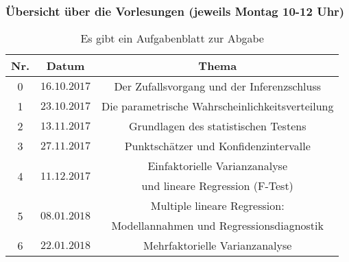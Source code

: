 \documentclass[usenames,dvipsnames,handout]{beamer}
\begin{document}
 \begin{frame}
 \frametitle{Übersicht über die Vorlesungen (jeweils Montag 10-12 Uhr)}%
    \begin{table}
\begin{center}
\caption{\colorbox{yellow!40}{Es gibt ein Aufgabenblatt zur Abgabe}}
  \begin{tabular}{|c|c|c|}
    \hline
    Nr. & Datum & Thema \\ \hline
    0 &   $ 16.10.2017$   &  \colorbox{blue!10}{  Der Zufallsvorgang und der Inferenzschluss}   \\ \hline
    \colorbox{yellow!40}{1} &  $23.10.2017$  &   \colorbox{blue!10}{Die parametrische  Wahrscheinlichkeitsverteilung } \\ \hline
    \colorbox{yellow!40}{2} &   $13.11.2017$   &   \colorbox{green!40}{Grundlagen des statistischen Testens}\\ \hline
    \colorbox{yellow!40}{3} &   $27.11.2017$   &   \colorbox{green!40}{Punktschätzer und Konfidenzintervalle }\\ \hline
  \multirow{2}{*}{\colorbox{yellow!40}{4}} &  \multirow{2}{*}{$11.12.2017$}& \colorbox{violet!40}{Einfaktorielle
  Varianzanalyse} \\ %
                   &        & \colorbox{violet!40}{und lineare Regression (F-Test)}\\ \hline  
                   \multirow{2}{*}{\colorbox{yellow!40}{5}} &  \multirow{2}{*}{$08.01.2018$}& \colorbox{violet!40}{Multiple lineare Regression:} \\ %
                   &        & \colorbox{violet!40}{Modellannahmen und Regressionsdiagnostik}\\ \hline 
    6 &   $22.01.2018$     &  \colorbox{violet!40}{Mehrfaktorielle Varianzanalyse} \\ \hline
  \end{tabular}
  \end{center}
  \label{tab:multicol}
  \end{table}
\end{frame}
\end{document}
